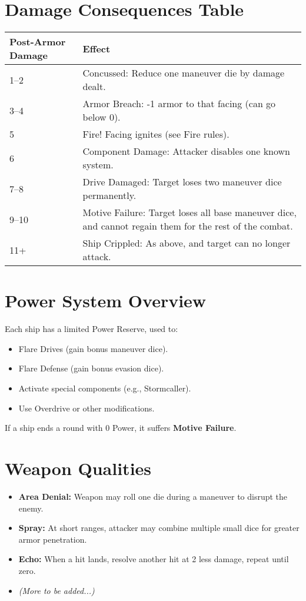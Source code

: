 \documentclass[11pt]{article}
\begin{document}
\newpage
\section{Damage Consequences Table}

\begin{tabular}{@{}ll@{}}
\toprule
\textbf{Post-Armor Damage} & \textbf{Effect} \\ \midrule
1--2 & Concussed: Reduce one maneuver die by damage dealt. \\
3--4 & Armor Breach: -1 armor to that facing (can go below 0). \\
5    & Fire! Facing ignites (see Fire rules). \\
6    & Component Damage: Attacker disables one known system. \\
7--8 & Drive Damaged: Target loses two maneuver dice permanently. \\
9--10 & Motive Failure: Target loses all base maneuver dice, and cannot regain them for the rest of the combat. \\
11+  & Ship Crippled: As above, and target can no longer attack. \\
\bottomrule
\end{tabular}

\section{Power System Overview}

Each ship has a limited Power Reserve, used to:
\begin{itemize}
    \item Flare Drives (gain bonus maneuver dice).
    \item Flare Defense (gain bonus evasion dice).
    \item Activate special components (e.g., Stormcaller).
    \item Use Overdrive or other modifications.
\end{itemize}
If a ship ends a round with 0 Power, it suffers \textbf{Motive Failure}.

\section{Weapon Qualities}

\begin{itemize}
    \item \textbf{Area Denial:} Weapon may roll one die during a maneuver to disrupt the enemy.
    \item \textbf{Spray:} At short ranges, attacker may combine multiple small dice for greater armor penetration.
    \item \textbf{Echo:} When a hit lands, resolve another hit at 2 less damage, repeat until zero.
    \item \textit{(More to be added...)}
\end{itemize}
\end{document}
